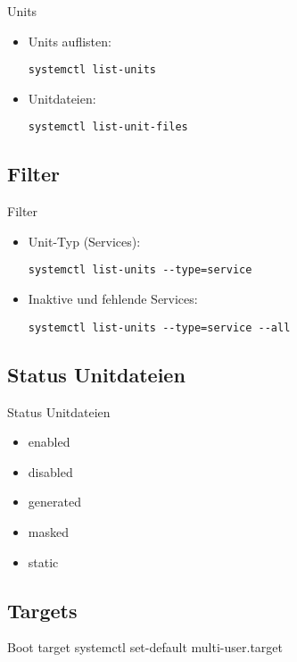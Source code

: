 \begin{frame}[fragile]{Units}
  \begin{itemize}
    \item
Units auflisten:

    \verb|systemctl list-units|
    \item
Unitdateien:

\verb|systemctl list-unit-files|
  \end{itemize}
\end{frame}

\subsection{Filter}

\begin{frame}[fragile]{Filter}
  \begin{itemize}
    \item
	    Unit-Typ (Services):

    \verb|systemctl list-units --type=service|

\item
	Inaktive und fehlende Services:

    \verb|systemctl list-units --type=service --all|
  \end{itemize}
\end{frame}

\subsection{Status Unitdateien}

\begin{frame}[fragile]{Status Unitdateien}
\begin{itemize}
\item enabled
\item disabled
\item generated
\item masked
\item static
\end{itemize}
\end{frame}


\subsection{Targets}

\begin{frame}{Boot target}
 systemctl set-default multi-user.target
\end{frame}

